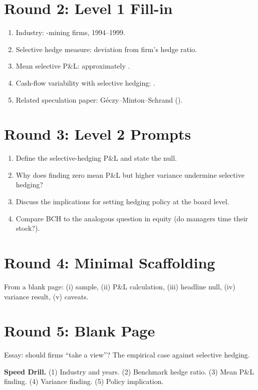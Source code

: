 \documentclass[11pt]{article}
\newcommand{\blank}[1]{\underline{\hspace{#1}}}
\begin{document}
\section*{Round 2: Level 1 Fill-in}
\begin{enumerate}
\item Industry: \blank{1cm}-mining firms, 1994--1999.
\item Selective hedge measure: deviation from firm's \blank{2cm} hedge ratio.
\item Mean selective P\&L: approximately \blank{1cm}.
\item Cash-flow variability with selective hedging: \blank{1cm}.
\item Related speculation paper: Géczy--Minton--Schrand (\blank{1cm}).
\end{enumerate}

\section*{Round 3: Level 2 Prompts}
\begin{enumerate}
\item Define the selective-hedging P\&L and state the null.
\item Why does finding zero mean P\&L but higher variance undermine selective hedging?
\item Discuss the implications for setting hedging policy at the board level.
\item Compare BCH to the analogous question in equity (do managers time their stock?).
\end{enumerate}

\section*{Round 4: Minimal Scaffolding}
From a blank page: (i) sample, (ii) P\&L calculation, (iii) headline null, (iv) variance result, (v) caveats.

\section*{Round 5: Blank Page}
Essay: should firms ``take a view''? The empirical case against selective hedging.

\vspace{6pt}
\begin{drillbox}
\textbf{Speed Drill.} (1) Industry and years. (2) Benchmark hedge ratio. (3) Mean P\&L finding. (4) Variance finding. (5) Policy implication.
\end{drillbox}
\end{document}
